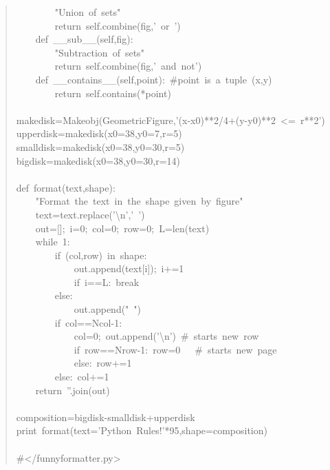 \documentclass[10pt,english]{article}
\begin{document}
\begin{quote}
\begin{ttfamily}
\begin{flushleft}
\mbox{~~~~~~~~"Union~of~sets"}\\
\mbox{~~~~~~~~return~self.combine(fig,'~or~')}\\
\mbox{~~~~def~{\_}{\_}sub{\_}{\_}(self,fig):}\\
\mbox{~~~~~~~~"Subtraction~of~sets"}\\
\mbox{~~~~~~~~return~self.combine(fig,'~and~not')}\\
\mbox{~~~~def~{\_}{\_}contains{\_}{\_}(self,point):~{\#}point~is~a~tuple~(x,y)}\\
\mbox{~~~~~~~~return~self.contains(*point)}\\
\mbox{}\\
\mbox{makedisk=Makeobj(GeometricFigure,'(x-x0)**2/4+(y-y0)**2~<=~r**2')}\\
\mbox{upperdisk=makedisk(x0=38,y0=7,r=5)}\\
\mbox{smalldisk=makedisk(x0=38,y0=30,r=5)}\\
\mbox{bigdisk=makedisk(x0=38,y0=30,r=14)}\\
\mbox{}\\
\mbox{def~format(text,shape):}\\
\mbox{~~~~"Format~the~text~in~the~shape~given~by~figure"}\\
\mbox{~~~~text=text.replace('{\textbackslash}n','~')}\\
\mbox{~~~~out=[];~i=0;~col=0;~row=0;~L=len(text)}\\
\mbox{~~~~while~1:}\\
\mbox{~~~~~~~~if~(col,row)~in~shape:}\\
\mbox{~~~~~~~~~~~~out.append(text[i]);~i+=1}\\
\mbox{~~~~~~~~~~~~if~i==L:~break}\\
\mbox{~~~~~~~~else:}\\
\mbox{~~~~~~~~~~~~out.append("~")}\\
\mbox{~~~~~~~~if~col==Ncol-1:}\\
\mbox{~~~~~~~~~~~~col=0;~out.append('{\textbackslash}n')~{\#}~starts~new~row}\\
\mbox{~~~~~~~~~~~~if~row==Nrow-1:~row=0~~~{\#}~starts~new~page}\\
\mbox{~~~~~~~~~~~~else:~row+=1}\\
\mbox{~~~~~~~~else:~col+=1~}\\
\mbox{~~~~return~''.join(out)}\\
\mbox{}\\
\mbox{composition=bigdisk-smalldisk+upperdisk}\\
\mbox{print~format(text='Python~Rules!'*95,shape=composition)}\\
\mbox{}\\
\mbox{{\#}</funnyformatter.py>}
\end{flushleft}\end{ttfamily}
\end{quote}
\end{document}
